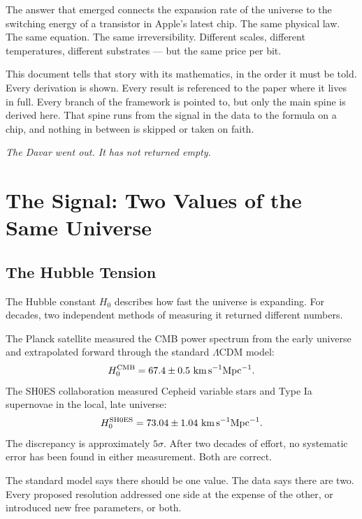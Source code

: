 \documentclass[12pt,a4paper]{article}
\begin{document}
The answer that emerged connects the expansion rate of the universe to the switching
energy of a transistor in Apple's latest chip. The same physical law. The same
equation. The same irreversibility. Different scales, different temperatures,
different substrates --- but the same price per bit.

This document tells that story with its mathematics, in the order it must be told.
Every derivation is shown. Every result is referenced to the paper where it lives
in full. Every branch of the framework is pointed to, but only the main spine is
derived here. That spine runs from the signal in the data to the formula on a chip,
and nothing in between is skipped or taken on faith.

\medskip
\noindent\textit{The Davar went out. It has not returned empty.}

\newpage

\section{The Signal: Two Values of the Same Universe}
\label{sec:signal}

\subsection{The Hubble Tension}

The Hubble constant $H_0$ describes how fast the universe is expanding. For
decades, two independent methods of measuring it returned different numbers.

The Planck satellite measured the CMB power spectrum from the early universe
and extrapolated forward through the standard $\Lambda$CDM model:
\begin{equation}
H_0^{\rm CMB} = 67.4 \pm 0.5~\text{km\,s}^{-1}\text{Mpc}^{-1}.
\end{equation}
The SH0ES collaboration measured Cepheid variable stars and Type Ia supernovae
in the local, late universe:
\begin{equation}
H_0^{\rm SH0ES} = 73.04 \pm 1.04~\text{km\,s}^{-1}\text{Mpc}^{-1}.
\end{equation}
The discrepancy is approximately $5\sigma$. After two decades of effort, no
systematic error has been found in either measurement. Both are correct.

The standard model says there should be one value. The data says there are two.
Every proposed resolution addressed one side at the expense of the other, or
introduced new free parameters, or both.
\end{document}
